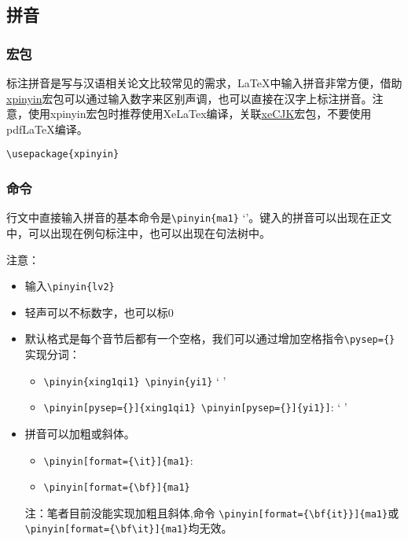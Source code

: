 \documentclass[a4paper,12pt]{article}
\begin{document}
\subsection{拼音}

\subsubsection{宏包}
标注拼音是写与汉语相关论文比较常见的需求，LaTeX中输入拼音非常方便，借助\href{https://www.ctan.org/pkg/xpinyin}{xpinyin}宏包可以通过输入数字来区别声调，也可以直接在汉字上标注拼音。注意，使用xpinyin宏包时推荐使用XeLaTex编译，关联\href{https://www.ctan.org/pkg/xecjk}{xeCJK}宏包，不要使用pdfLaTeX编译。

\verb|\usepackage{xpinyin}|


\subsubsection{命令}

行文中直接输入拼音的基本命令是\verb|\pinyin{ma1}| `'。键入的拼音可以出现在正文中，可以出现在例句标注中，也可以出现在句法树中。

\vspace{5mm}
注意：

\begin{itemize}
	\item {} 输入\verb|\pinyin{lv2}|
	\item 轻声可以不标数字，也可以标0
	\item 默认格式是每个音节后都有一个空格，我们可以通过增加空格指令\verb|\pysep={}| 实现分词：
		\begin{itemize}
			\item \verb|\pinyin{xing1qi1} \pinyin{yi1}| ` '
			\item \verb|\pinyin[pysep={}]{xing1qi1} \pinyin[pysep={}]{yi1}]|: ` '
		\end{itemize}
	\item 拼音可以加粗或斜体。
		\begin{itemize}
			\item \verb||:  \pinyin[format={\it}]{ma1}
			\item \verb|| \pinyin[format={\bf}]{ma1}
		\end{itemize}
		注：笔者目前没能实现加粗且斜体,命令
		\verb|\pinyin[format={\bf{it}}]{ma1}|或 \verb|\pinyin[format={\bf\it}]{ma1}|均无效。
\end{itemize}
\end{document}
